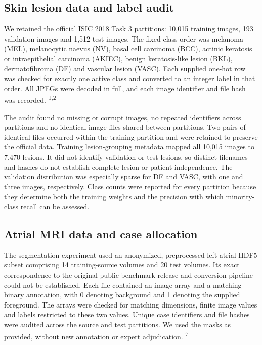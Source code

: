 \documentclass[11pt,a4paper]{article}
\begin{document}
\subsection*{Skin lesion data and label audit}

We retained the official ISIC 2018 Task 3 partitions: 10,015 training images, 193 validation images and 1,512 test images. The fixed class order was melanoma (MEL), melanocytic naevus (NV), basal cell carcinoma (BCC), actinic keratosis or intraepithelial carcinoma (AKIEC), benign keratosis-like lesion (BKL), dermatofibroma (DF) and vascular lesion (VASC). Each supplied one-hot row was checked for exactly one active class and converted to an integer label in that order. All JPEGs were decoded in full, and each image identifier and file hash was recorded. \textsuperscript{1,2}



The audit found no missing or corrupt images, no repeated identifiers across partitions and no identical image files shared between partitions. Two pairs of identical files occurred within the training partition and were retained to preserve the official data. Training lesion-grouping metadata mapped all 10,015 images to 7,470 lesions. It did not identify validation or test lesions, so distinct filenames and hashes do not establish complete lesion or patient independence. The validation distribution was especially sparse for DF and VASC, with one and three images, respectively. Class counts were reported for every partition because they determine both the training weights and the precision with which minority-class recall can be assessed.



\subsection*{Atrial MRI data and case allocation}

The segmentation experiment used an anonymized, preprocessed left atrial HDF5 subset comprising 14 training-source volumes and 20 test volumes. Its exact correspondence to the original public benchmark release and conversion pipeline could not be established. Each file contained an image array and a matching binary annotation, with 0 denoting background and 1 denoting the supplied foreground. The arrays were checked for matching dimensions, finite image values and labels restricted to these two values. Unique case identifiers and file hashes were audited across the source and test partitions. We used the masks as provided, without new annotation or expert adjudication. \textsuperscript{7}
\end{document}
